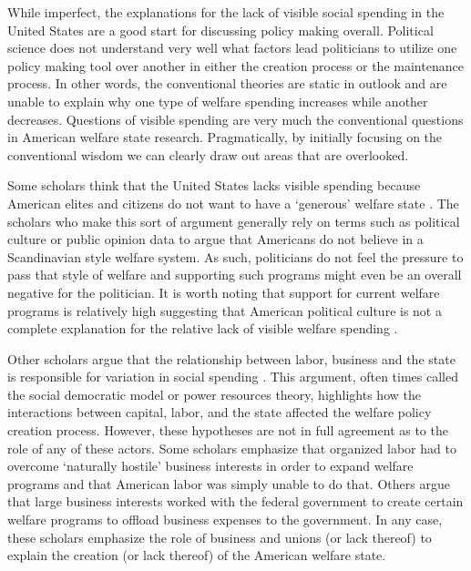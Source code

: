 \documentclass[12pt]{article}
\begin{document}
While imperfect, the explanations for the lack of visible social spending in the United States are a good start for discussing policy making overall. Political science does not understand very well what factors lead politicians to utilize one policy making tool over another in either the creation process or the maintenance process. In other words, the conventional theories are static in outlook and are unable to explain why one type of welfare spending increases while another decreases. Questions of visible spending are very much the conventional questions in American welfare state research. Pragmatically, by initially focusing on the conventional wisdom we can clearly draw out areas that are overlooked.

Some scholars think that the United States lacks visible spending because American elites and citizens do not want to have a `generous' welfare state \citep{king1973}. The scholars who make this sort of argument generally rely on terms such as political culture or public opinion data to argue that Americans do not believe in a Scandinavian style welfare system. As such, politicians do not feel the pressure to pass that style of welfare and supporting such programs might even be an overall negative for the politician. It is worth noting that support for current welfare programs is relatively high suggesting that American political culture is not a complete explanation for the relative lack of visible welfare spending \citep[Ch. 6]{howard2008}.

Other scholars argue that the relationship between labor, business and the state is responsible for variation in social spending \citep{korpi1980, swenson2004}. This argument, often times called the social democratic model or power resources theory, highlights how the interactions between capital, labor, and the state affected the welfare policy creation process. However, these hypotheses are not in full agreement as to the role of any of these actors. Some scholars emphasize that organized labor had to overcome `naturally hostile' business interests in order to expand welfare programs and that American labor was simply unable to do that. Others argue that large business interests worked with the federal government to create certain welfare programs to offload business expenses to the government. In any case, these scholars emphasize the role of business and unions (or lack thereof) to explain the creation (or lack thereof) of the American welfare state. 
\end{document}
